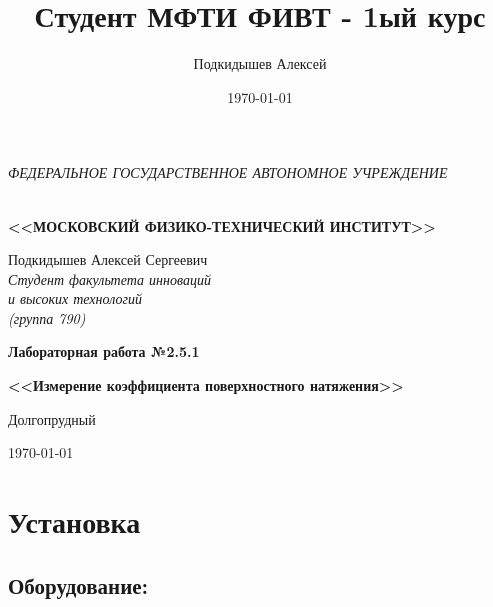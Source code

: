 \documentclass[a4paper,12pt]{article}
\author{Подкидышев Алексей}
\title{Студент МФТИ ФИВТ - 1ый курс}
\date{\today}
\theoremstyle{plain} %
\theoremstyle{definition} %
\theoremstyle{remark} %
\begin{document}

\thispagestyle{empty}
\begin{center}
	\textit{\MakeTextUppercase{федеральное государственное автономное учреждение}}
		
	\vspace{0.5ex}
	
	\textbf{ \\ \MakeTextUppercase{<<Московский Физико-технический институт>>}}
\end{center}
\vspace{13ex}
\begin{flushright}
	\noindent
	{Подкидышев Алексей Сергеевич}
	\\
	\textit{Студент факультета инноваций\\ и высоких технологий\\(группа 790)}
\end{flushright}
\begin{center}
	\vspace{23ex}
	{\LARGE\textbf{Лабораторная работа №2.5.1}}
	\vspace{1ex}
		
	\textbf{\large{<<Измерение коэффициента поверхностного натяжения>>}}
	
	\vfill
	Долгопрудный 
	
	{\today}
\end{center}

\newpage
\section{Установка} \label{sec:Inistal}
\subsection{Оборудование:}
\end{document}
